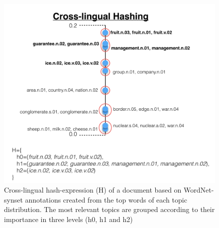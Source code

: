 \begin{figure}[t]\centering
\includegraphics[scale=0.4]{density-hash.png}
\caption{Cross-lingual hash-expression (H) of a document based on WordNet-synset annotations created from the top words of each topic distribution. The most relevant topics are grouped according to their importance in three levels (h0, h1 and h2)}
\label{fig:density_hash2}
\end{figure}

